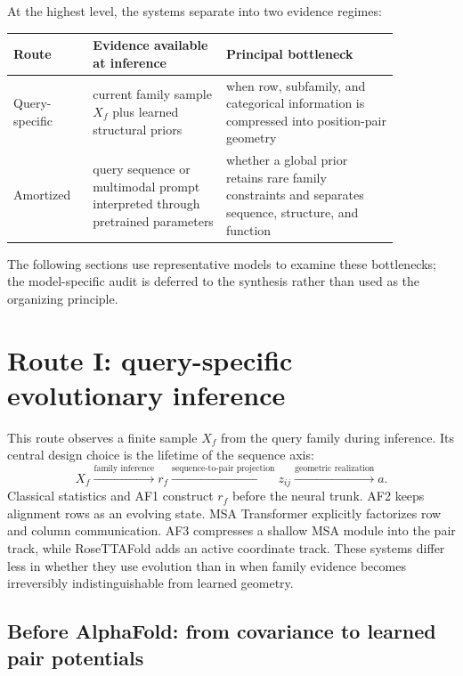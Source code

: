 \documentclass[10pt]{article}
\begin{document}
At the highest level, the systems separate into two evidence regimes:
\begin{center}
\small
\begin{tabular}{>{\raggedright\arraybackslash}p{0.17\linewidth}
                >{\raggedright\arraybackslash}p{0.30\linewidth}
                >{\raggedright\arraybackslash}p{0.39\linewidth}}
\toprule
Route & Evidence available at inference & Principal bottleneck \\
\midrule
Query-specific & current family sample $X_f$ plus learned structural priors & when row, subfamily, and categorical information is compressed into position-pair geometry \\
Amortized & query sequence or multimodal prompt interpreted through pretrained parameters & whether a global prior retains rare family constraints and separates sequence, structure, and function \\
\bottomrule
\end{tabular}
\end{center}
The following sections use representative models to examine these bottlenecks; the model-specific
audit is deferred to the synthesis rather than used as the organizing principle.

\section{Route I: query-specific evolutionary inference}

This route observes a finite sample $X_f$ from the query family during inference.  Its central
design choice is the lifetime of the sequence axis:
\begin{equation}
X_f
\xrightarrow{\text{family inference}}
r_f
\xrightarrow{\text{sequence-to-pair projection}}
z_{ij}
\xrightarrow{\text{geometric realization}}
a.
\label{eq:query-specific-route}
\end{equation}
Classical statistics and AF1 construct $r_f$ before the neural trunk.  AF2 keeps alignment rows as
an evolving state.  MSA Transformer explicitly factorizes row and column communication.  AF3
compresses a shallow MSA module into the pair track, while RoseTTAFold adds an active coordinate
track.  These systems differ less in whether they use evolution than in when family evidence becomes
irreversibly indistinguishable from learned geometry.

\subsection{Before AlphaFold: from covariance to learned pair potentials}
\end{document}
